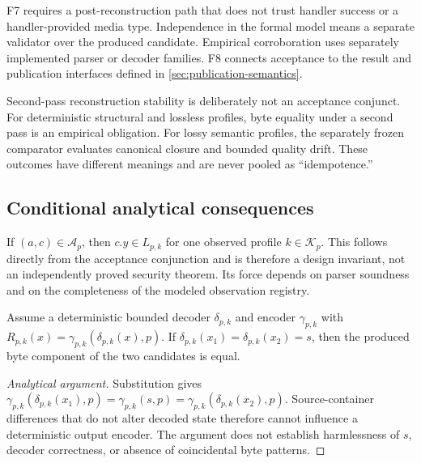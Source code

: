F7 requires a post-reconstruction path that does not trust handler success or a
handler-provided media type. Independence in the formal model means a separate
validator over the produced candidate. Empirical corroboration uses separately
implemented parser or decoder families. F8 connects acceptance to the result
and publication interfaces defined in \cref{sec:publication-semantics}.

Second-pass reconstruction stability is deliberately not an acceptance
conjunct. For deterministic structural and lossless profiles, byte equality
under a second pass is an empirical obligation. For lossy semantic profiles,
the separately frozen comparator evaluates canonical closure and bounded
quality drift. These outcomes have different meanings and are never pooled as
``idempotence.''

\subsection{Conditional analytical consequences}

\begin{property}
\label{prop:accepted-canonical}
If $(a,c)\in\mathcal{A}_{p}$, then $c.y\in L_{p,k}$ for one observed profile
$k\in\mathcal{K}_p$. This follows directly from the acceptance conjunction and
is therefore a design invariant, not an independently proved security theorem.
Its force depends on parser soundness and on the completeness of the modeled
observation registry.
\end{property}

\begin{proposition}
\label{prop:semantic-source-independence}
Assume a deterministic bounded decoder $\delta_{p,k}$ and encoder
$\gamma_{p,k}$ with
$R_{p,k}(x)=\gamma_{p,k}(\delta_{p,k}(x),p)$. If
$\delta_{p,k}(x_1)=\delta_{p,k}(x_2)=s$, then the produced byte component of the
two candidates is equal.
\end{proposition}

\begin{proof}[Analytical argument]
Substitution gives
$\gamma_{p,k}(\delta_{p,k}(x_1),p)=\gamma_{p,k}(s,p)=
\gamma_{p,k}(\delta_{p,k}(x_2),p)$. Source-container differences that do not
alter decoded state therefore cannot influence a deterministic output encoder.
The argument does not establish harmlessness of $s$, decoder correctness, or
absence of coincidental byte patterns.
\end{proof}

